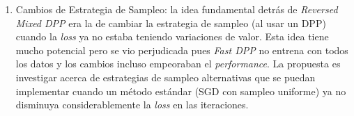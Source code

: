 \begin{enumerate}
    \item Cambios de Estrategia de Sampleo: la idea fundamental detrás de \textit{Reversed Mixed DPP} era la de cambiar la estrategia de sampleo (al usar un DPP) cuando la \textit{loss} ya no estaba teniendo variaciones de valor. Esta idea tiene mucho potencial pero se vio perjudicada pues \textit{Fast DPP} no entrena con todos los datos y los cambios incluso empeoraban el \textit{performance}. La propuesta es investigar acerca de estrategias de sampleo alternativas que se puedan implementar cuando un método estándar (SGD con sampleo uniforme) ya no disminuya considerablemente la \textit{loss} en las iteraciones.  
    
\end{enumerate}
